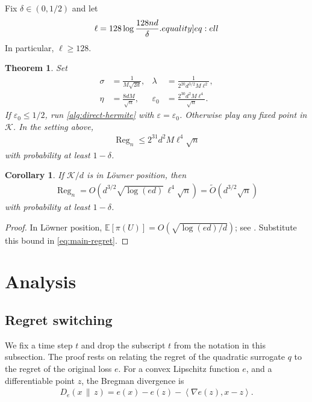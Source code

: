 \documentclass[11pt]{article}
\newtheorem{theorem}{Theorem}
\newtheorem{corollary}[corollary]{Corollary}
\newcommand{\eqlabel}[1]{\label[equality]{#1}}
\newcommand{\E}{\mathbb E}
\newcommand{\K}{\mathcal K}
\newcommand{\1}{\mathbf 1}
\newcommand{\eps}{\varepsilon}
\newcommand{\ip}[2]{\left\langle #1,#2\right\rangle}
\begin{document}
Fix $\delta\in(0,1/2)$ and let
\begin{align}
    \ell=128\log\frac{128nd}{\delta}.
    \eqlabel{eq:ell}
\end{align}
In particular, $\ell\geq128$.

\begin{theorem}
    \label{thm:main}
    Set
    \begin{align}
        \sigma  & =\frac1{M\sqrt{2d}},
                &
        \lambda & =\frac{1}{2^{20}d^{3/2}M\ell^2},
        \label{eq:parameters-one}                    \\
        \eta    & =\frac{8dM}{\sqrt n},
                &
        \eps_0  & =\frac{2^{30}d^2M\ell^4}{\sqrt n}.
        \label{eq:parameters-two}
    \end{align}
    If $\eps_0\leq1/2$, run \cref{alg:direct-hermite} with $\eps=\eps_0$.
    Otherwise play any fixed point in $\K$.  In the setting above,
    \begin{align}
        \operatorname{Reg}_n
        \leq 2^{31}d^2M\ell^4\sqrt n
        \label{eq:main-regret}
    \end{align}
    with probability at least $1-\delta$.
\end{theorem}

\begin{corollary}
    \label{cor:loewner}
    If $\K/d$ is in L\"owner position, then
    \begin{align}
        \operatorname{Reg}_n
        =O\!\left(
        d^{3/2}\sqrt{\log(ed)}\,\ell^4\sqrt n
        \right)
        =\widetilde O(d^{3/2}\sqrt n)
    \end{align}
    with probability at least $1-\delta$.
\end{corollary}

\begin{proof}
    In L\"owner position,
    $\E[\pi(U)]=O(\sqrt{\log(ed)/d})$; see
    \citet[Table~10.1(a)]{lattimore2026bandit}.  Substitute this bound in
    \eqref{eq:main-regret}.
\end{proof}

\section{Analysis}
\label{sec:analysis}
\subsection{Regret switching}
We fix a time step $t$ and drop the subscript $t$ from the notation in this subsection.
The proof rests on relating the regret of the quadratic surrogate $q$ to the regret of the original loss $e$.
For a convex Lipschitz function $e$, and a differentiable point $z$, the Bregman divergence is
\begin{align}
    D_e(x\,\|\,z)
    =e(x)-e(z)-\ip{\nabla e(z)}{x-z}.
    \label{eq:bregman}
\end{align}
\end{document}
